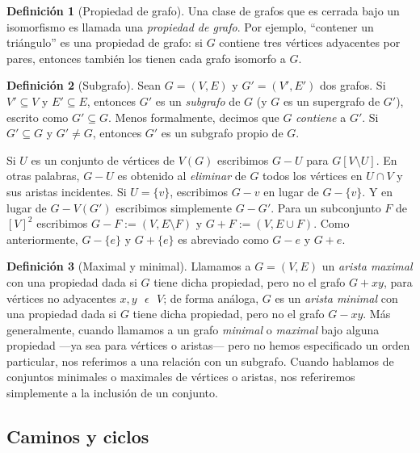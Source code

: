 \documentclass[letterpaper, 11pt]{book}
\theoremstyle{definition}
\newtheorem{definition}{Definición}[chapter]
\theoremstyle{remark}
\begin{document}
\begin{definition}[Propiedad de grafo]
\label{Propiedad}
	Una clase de grafos que es cerrada bajo un isomorfismo es llamada una \emph{propiedad de grafo}. Por ejemplo, ``contener un triángulo'' es una propiedad de grafo: si $G$ contiene tres vértices adyacentes por  pares, entonces también los tienen cada grafo isomorfo a $G$.
\end{definition}


\begin{definition}[Subgrafo]
\label{Subgrafo}
	Sean $G=(V,E)$ y $G'=(V',E')$ dos grafos. Si $V' \subseteq V$ y $E' \subseteq E$, entonces $G'$ es un \emph{subgrafo} de $G$ (y $G$ es un supergrafo de $G'$), escrito como $G' \subseteq G$. Menos formalmente, decimos que $G$ \emph{contiene} a $G'$. Si $G' \subseteq G$ y $G' \neq G$, entonces $G'$ es un subgrafo propio de $G$.
\end{definition}


Si $U$ es un conjunto de vértices de $V(G)$ escribimos $G-U$ para $G[V \setminus U]$. En otras palabras, $G-U$ es obtenido al \emph{eliminar} de $G$ todos los vértices en $U \cap V$ y sus aristas incidentes. Si $U = \{v\}$, escribimos $G - v$ en lugar de $G - \{v\}$. Y en lugar de $G - V(G')$ escribimos simplemente $G - G'$. Para un subconjunto $F$ de $[V]^{2}$ escribimos $G - F := (V, E \setminus  F)$ y $G + F := (V, E \cup F)$. Como anteriormente, $G-\{e\}$ y $G+\{e\}$ es abreviado como $G-e$ y $G+e$. 


\begin{definition}[Maximal y minimal]
\label{MaximalMinimal}
	Llamamos a $G=(V,E)$ un \emph{arista maximal} con una propiedad dada si $G$ tiene dicha propiedad, pero no el grafo $G + xy$, para vértices no adyacentes $x,y \text{ } \epsilon \text{ } V$; de forma análoga, $G$ es un \emph{arista minimal} con una propiedad dada si $G$ tiene dicha propiedad, pero no el grafo $G - xy$. 
	Más generalmente, cuando llamamos a un grafo \emph{minimal} o \emph{maximal} bajo alguna propiedad ---ya sea para vértices o aristas--- pero no hemos especificado un orden particular, nos referimos a una relación con un subgrafo. Cuando hablamos de conjuntos minimales o maximales de vértices o aristas, nos referiremos simplemente a la inclusión de un conjunto.
\end{definition}



\subsection{Caminos y ciclos}
\label{sec:CaminosCiclos}
\end{document}
